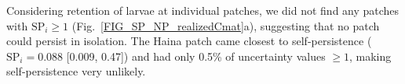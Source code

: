 \documentclass[12pt, oneside]{article}   	%
\begin{document}
Considering retention of larvae at individual patches, we did not find any patches with $\text{SP}_{i} \geq 1$ (Fig.\ \ref{FIG_SP_NP_realizedCmat}a), suggesting that no patch could persist in isolation. The Haina patch came closest to self-persistence ($\text{SP}_i = 0.088$ [0.009, 0.47]) and had only 0.5\% of uncertainty values $ \geq 1$, making self-persistence very unlikely. %



\end{document}

